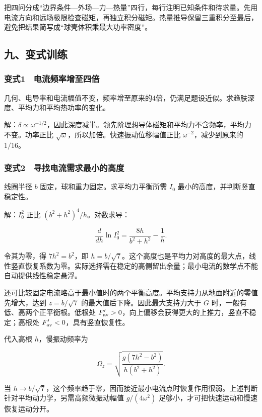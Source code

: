 \documentclass[12pt,a4paper,fontset=fandol]{ctexart}
\begin{document}
把四问分成``边界条件---外场---力---热量''四行，每行注明已知条件和待求量。先用电流方向和远场极限检查磁矩，再独立积分磁矩。热量推导保留三重积分至最后，避免把结果简写成``球壳体积乘最大功率密度''。

\subsection{九、变式训练}\label{ux4e5dux53d8ux5f0fux8badux7ec3-5}

\subsubsection{变式1　电流频率增至四倍}\label{ux53d8ux5f0f1-ux7535ux6d41ux9891ux7387ux589eux81f3ux56dbux500d}

几何、电导率和电流幅值不变，频率增至原来的4倍，仍满足题设近似。求趋肤深度、平均力和平均热功率的变化。

解：\(\delta\propto\omega^{-1/2}\)，因此深度减半。领先阶理想导体磁矩和平均力不含频率，平均力不变。功率正比
\(\sqrt\omega\)，所以加倍。快速振动位移幅值正比
\(\omega^{-2}\)，减少到原来的 \(1/16\)。

\subsubsection{变式2　寻找电流需求最小的高度}\label{ux53d8ux5f0f2-ux5bfbux627eux7535ux6d41ux9700ux6c42ux6700ux5c0fux7684ux9ad8ux5ea6}

线圈半径 \(b\) 固定，球和重力固定。求平均力平衡所需 \(I_0\)
最小的高度，并判断竖直稳定性。

解：\(I_0^2\) 正比 \((b^2+h^2)^4/h\)。对数求导：

\[\frac{d}{dh}\ln I_0^2=
\frac{8h}{b^2+h^2}-\frac1h.\]

令其为零，得 \(7h^2=b^2\)，即
\(h=b/\sqrt7\)。这个高度也是平均力对高度的最大点，线性竖直恢复系数为零。实际选择需在稳定的高侧留出余量；最小电流的数学点不能自动提供线性稳定悬浮。

还可比较固定电流略高于最小值时的两个平衡高度。平均支持力从地面附近的零值先增大，达到
\(z=b/\sqrt7\) 的最大值后下降。因此最大支持力大于 \(G\)
时，一般有低、高两个正平衡根。低根处
\(F'_{\rm av}>0\)，向上偏移会获得更大的上推力，竖直不稳定；高根处
\(F'_{\rm av}<0\)，具有竖直恢复性。

代入高根 \(h\)，慢振动频率为

\[\Omega_z=\sqrt{\frac{g(7h^2-b^2)}{h(b^2+h^2)}}.\]

当
\(h\to b/\sqrt7\)，这个频率趋于零，因而接近最小电流点时恢复作用很弱。上述判断针对平均动力学，另需高频微振动幅值
\(g/(4\omega^2)\) 足够小，才可把快速运动和慢速恢复运动分开。
\end{document}
